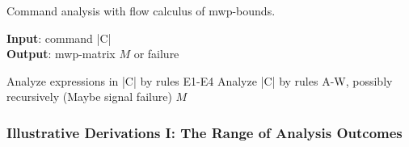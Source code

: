 \begin{algorithm}
\caption[Command analysis with flow calculus of mwp-bounds]
{Command analysis with flow calculus of mwp-bounds.}\label{alg:comms}
\textbf{Input}: command \pr|C| \\
\textbf{Output}: mwp-matrix \(M\) or failure
\begin{algorithmic}[1]
\State Analyze expressions in \pr|C| by rules E1-E4
\State Analyze \pr|C| by rules A-W, possibly recursively
\State (Maybe signal failure)
\State \Return \(M\) 
\end{algorithmic}
\end{algorithm}

\subsubsection{Illustrative Derivations I: The Range of Analysis Outcomes}\label{mwp-derivations}

